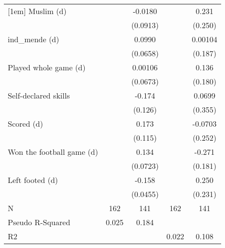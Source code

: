 {\begin{tabular}{l*{4}{c}}
[1em]
Muslim (d)          &                     &     -0.0180         &                     &       0.231         \\
                    &                     &    (0.0913)         &                     &     (0.250)         \\
[1em]
ind\_mende (d)       &                     &      0.0990         &                     &     0.00104         \\
                    &                     &    (0.0658)         &                     &     (0.187)         \\
[1em]
Played whole game (d)&                     &     0.00106         &                     &       0.136         \\
                    &                     &    (0.0673)         &                     &     (0.180)         \\
[1em]
Self-declared skills&                     &      -0.174         &                     &      0.0699         \\
                    &                     &     (0.126)         &                     &     (0.355)         \\
[1em]
Scored (d)          &                     &       0.173         &                     &     -0.0703         \\
                    &                     &     (0.115)         &                     &     (0.252)         \\
[1em]
Won the football game (d)&                     &       0.134\sym{*}  &                     &      -0.271         \\
                    &                     &    (0.0723)         &                     &     (0.181)         \\
[1em]
Left footed (d)     &                     &      -0.158\sym{***}&                     &       0.250         \\
                    &                     &    (0.0455)         &                     &     (0.231)         \\
\hline
N                   &         162         &         141         &         162         &         141         \\
Pseudo R-Squared    &       0.025         &       0.184         &                     &                     \\
R2                  &                     &                     &       0.022         &       0.108         \\
\hline\hline
\end{tabular}
}
